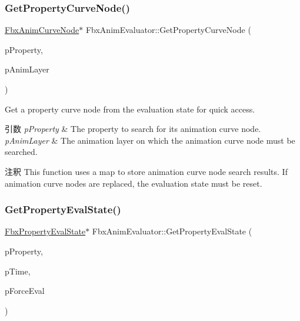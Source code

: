 \subsubsection{\texorpdfstring{Get\+Property\+Curve\+Node()}{GetPropertyCurveNode()}}
{\footnotesize\ttfamily \hyperlink{class_fbx_anim_curve_node}{Fbx\+Anim\+Curve\+Node}$\ast$ Fbx\+Anim\+Evaluator\+::\+Get\+Property\+Curve\+Node (\begin{DoxyParamCaption}\item[{\hyperlink{class_fbx_property}{Fbx\+Property} \&}]{p\+Property,  }\item[{\hyperlink{class_fbx_anim_layer}{Fbx\+Anim\+Layer} $\ast$}]{p\+Anim\+Layer }\end{DoxyParamCaption})}

Get a property curve node from the evaluation state for quick access. 
\begin{DoxyParams}{引数}
{\em p\+Property} & The property to search for its animation curve node. \\
\hline
{\em p\+Anim\+Layer} & The animation layer on which the animation curve node must be searched. \\
\hline
\end{DoxyParams}
\begin{DoxyRemark}{注釈}
This function uses a map to store animation curve node search results. If animation curve nodes are replaced, the evaluation state must be reset. 
\end{DoxyRemark}
\mbox{\label{class_fbx_anim_evaluator_a20ef23a07b86771090c64ec5f3cc7ced}} 
\subsubsection{\texorpdfstring{Get\+Property\+Eval\+State()}{GetPropertyEvalState()}}
{\footnotesize\ttfamily \hyperlink{class_fbx_property_eval_state}{Fbx\+Property\+Eval\+State}$\ast$ Fbx\+Anim\+Evaluator\+::\+Get\+Property\+Eval\+State (\begin{DoxyParamCaption}\item[{\hyperlink{class_fbx_property}{Fbx\+Property} \&}]{p\+Property,  }\item[{const \hyperlink{class_fbx_time}{Fbx\+Time} \&}]{p\+Time,  }\item[{bool}]{p\+Force\+Eval }\end{DoxyParamCaption})\hspace{0.3cm}{\ttfamily [protected]}}


